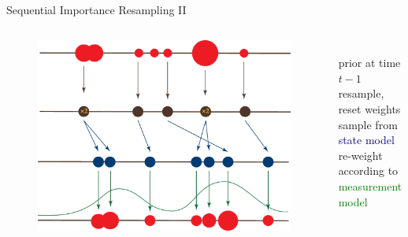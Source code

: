 \documentclass[aspectratio=169,19pt,xetex,handout]{beamer}
\begin{document}
\begin{frame}{Sequential Importance Resampling II}
\begin{columns}
\begin{figure}
\includegraphics[width=\textwidth]{sir}
\end{figure}
\phantom{foo} \\ 
\vspace{15pt}
prior at time $t-1$\\
\vspace{38pt}
resample, reset weights\\
\vspace{34pt}
sample from \textcolor{navy}{state model} \\
\vspace{38pt}
re-weight according to \textcolor{green}{measurement model}
\end{columns}
\end{frame}
\end{document}
